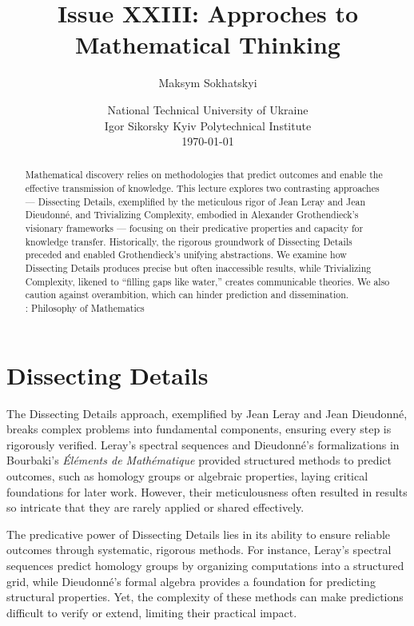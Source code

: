 \documentclass{article}
\begin{document}
\title{Issue XXIII: Approches to Mathematical Thinking}
\author{Maksym Sokhatskyi}
\date{ National Technical University of Ukraine \\
       \small Igor Sikorsky Kyiv Polytechnical Institute \\
       \today }
\maketitle

\begin{abstract}
Mathematical discovery relies on methodologies that predict outcomes and enable
the effective transmission of knowledge. This lecture explores two contrasting
approaches --- Dissecting Details, exemplified by the meticulous rigor of Jean Leray
and Jean Dieudonné, and Trivializing Complexity, embodied in Alexander Grothendieck’s
visionary frameworks --- focusing on their predicative properties and capacity for
knowledge transfer. Historically, the rigorous groundwork of Dissecting Details
preceded and enabled Grothendieck’s unifying abstractions. We examine how
Dissecting Details produces precise but often inaccessible results, while
Trivializing Complexity, likened to “filling gaps like water,” creates communicable
theories. We also caution against overambition, which can hinder prediction and dissemination. \\
: Philosophy of Mathematics
\end{abstract}

\section{Dissecting Details}
The Dissecting Details approach, exemplified by Jean Leray and Jean Dieudonné, breaks complex problems into fundamental components, ensuring every step is rigorously verified. Leray’s spectral sequences and Dieudonné’s formalizations in Bourbaki’s \textit{Éléments de Mathématique} provided structured methods to predict outcomes, such as homology groups or algebraic properties, laying critical foundations for later work. However, their meticulousness often resulted in results so intricate that they are rarely applied or shared effectively.

The predicative power of Dissecting Details lies in its ability to ensure reliable outcomes through systematic, rigorous methods. For instance, Leray’s spectral sequences predict homology groups by organizing computations into a structured grid, while Dieudonné’s formal algebra provides a foundation for predicting structural properties. Yet, the complexity of these methods can make predictions difficult to verify or extend, limiting their practical impact.
\end{document}
